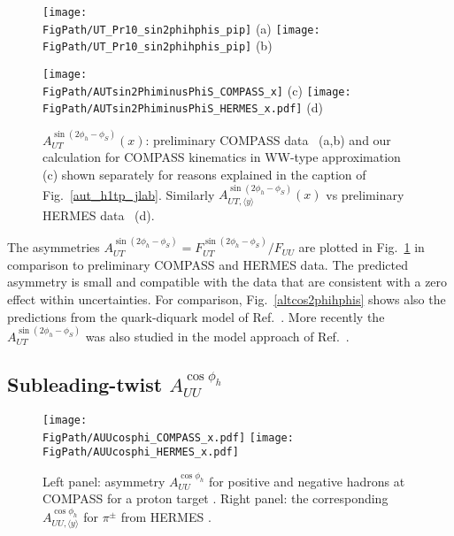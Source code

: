 \documentclass[a4paper,11pt]{article}
\newcommand{\blue}[1]{{\color{blue} #1}}
\newcommand{\ps}[1]{\blue{#1}}
\newcommand{\gs}[1]{{\color[rgb]{0.65,0,0.65}#1}}
\newcommand*{\FigPath}{./figs}%
\begin{document}
\begin{figure}[t!]
\centering
\texttt{[image: \\FigPath/UT\_Pr10\_sin2phihphis\_pip]} {\tiny (a)}%
\texttt{[image: \\FigPath/UT\_Pr10\_sin2phihphis\_pip]} {\tiny (b)}

\texttt{[image: \\FigPath/AUTsin2PhiminusPhiS\_COMPASS\_x]} {\tiny (c)}
\texttt{[image: \\FigPath/AUTsin2PhiminusPhiS\_HERMES\_x.pdf]} {\tiny (d)}

\vspace{-2mm}

\caption{\label{autsin2phihphis}
	$A_{UT}^{\sin(2 \phi_h - \phi_S)}(x)$: 
	preliminary COMPASS data~\cite{Parsamyan:2013fia} (a,b)
  \gs{and our calculation for COMPASS kinematics in WW-type 
      approximation (c) shown separately for reasons explained 
      in the caption of Fig.~\ref{aut_h1tp_jlab}.}
	Similarly $A_{UT, \langle y \rangle}^{\sin(2\phi_h-\phi_S)}(x)$ vs
	preliminary HERMES data~\cite{Schnell:2010zza} (d).
	}
\end{figure}


The asymmetries $A_{UT}^{\sin (2 \phi_h-\phi_S)}=F_{UT}^{\sin (2 \phi_h-\phi_S)}/F_{UU}$
are plotted in Fig.~\ref{autsin2phihphis} in comparison
to preliminary COMPASS \cite{Parsamyan:2013fia} and
HERMES \cite{Schnell:2010zza} data. The predicted
asymmetry is small and compatible with the data that are consistent
with a zero effect within uncertainties.
For comparison, Fig.~\ref{altcos2phihphis} shows also the predictions
from the quark-diquark model of Ref.~\cite{Kotzinian:2008fe}.
More recently the $A_{UT}^{\sin(2\phi_h -\phi_S)}$ was also studied in the
model approach of Ref.~\cite{Mao:2014aoa}.





\subsection{\boldmath Subleading-twist  $A_{UU}^{\cos\phi_h}$ }
\label{Sec-7.7:FUUcosphi}

\begin{figure}[t!]
\centering
\texttt{[image: \\FigPath/AUUcosphi\_COMPASS\_x.pdf]}
\texttt{[image: \\FigPath/AUUcosphi\_HERMES\_x.pdf]}
\caption{\label{auucosphi_jlab}
	Left panel: asymmetry $A_{UU}^{\cos\phi_h}$ for positive and negative
	hadrons at COMPASS for a proton target \cite{Adolph:2014pwc}. Right
	panel: the corresponding $A_{UU, \langle y \rangle}^{\cos\phi_h}$ for 
	$\pi^\pm$ from HERMES \cite{Airapetian:2012yg}.}
\end{figure}
\end{document}
